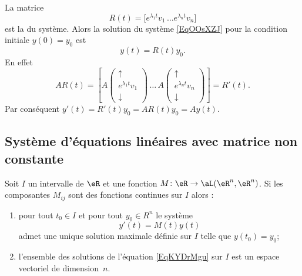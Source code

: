 La matrice 
\begin{equation}
    R(t)=\big[  e^{\lambda_1t}v_1\, \ldots  e^{\lambda_nt}v_n \big]
\end{equation}
est la  du système. Alors la solution du système \eqref{EqOOsXZJ} pour la condition initiale \( y(0)=y_0\) est 
\begin{equation}
    y(t)=R(t)y_0.
\end{equation}
En effet
\begin{equation}
    AR(t)=\left[  A\begin{pmatrix}
        \uparrow    \\ 
        e^{\lambda_1t}v_1    \\ 
        \downarrow    
    \end{pmatrix}\,\ldots\,A\begin{pmatrix}
        \uparrow    \\ 
        e^{\lambda_nt}v_n    \\ 
            \downarrow
    \end{pmatrix}\right]=R'(t).
\end{equation}
Par conséquent \( y'(t)=R'(t)y_0=AR(t)y_0=Ay(t)\).

\subsection{Système d'équations linéaires avec matrice non constante}

\begin{theorem}\label{ThoNYEXqxO}
    Soit \( I\) un intervalle de \( \eR\) et une fonction \( M\colon \eR\to \aL(\eR^n,\eR^n)\). Si les composantes \( M_{ij}\) sont des fonctions continues sur \( I\) alors :
    \begin{enumerate}
        \item
    pour tout \( t_0\in I\) et pour tout \( y_0\in R^n\) le système
    \begin{equation}    \label{EqKYDrMgu}
        y'(t)=M(t)y(t)
    \end{equation}
    admet une unique solution maximale définie sur \( I\) telle que \( y(t_0)=y_0\);
\item 
    l'ensemble des solutions de l'équation \eqref{EqKYDrMgu} sur \( I\) est un espace vectoriel de dimension~\( n\).
    \end{enumerate}
\end{theorem}

